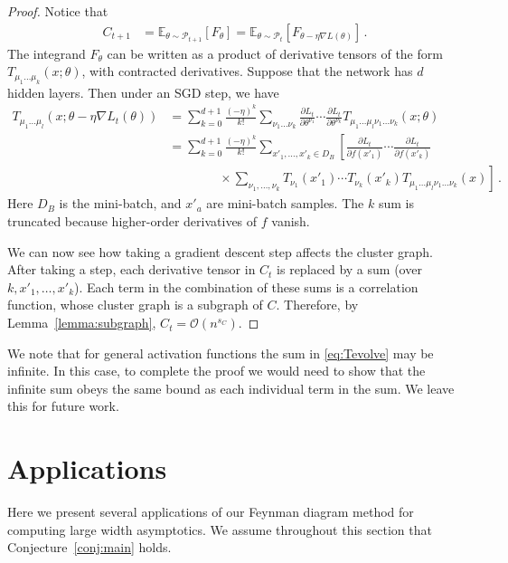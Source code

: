 \documentclass[english]{article}
\newcommand{\dho}{\partial}
\newcommand{\cO}{\ensuremath{\mathcal{O}}}
\newcommand{\cP}{\ensuremath{\mathcal{P}}}
\newcommand{\lexpp}[1]{\mathbb{E}_{#1}\left[}
\newcommand{\rexp}{\right]}
\begin{document}
\begin{proof}
  Notice that
  \begin{align}
    C_{t+1} &= \lexpp{\theta \sim \cP_{t+1}} F_\theta \rexp = \lexpp{\theta \sim \cP_{t}} F_{\theta - \eta \nabla L(\theta)} \rexp \,.
  \end{align}
  The integrand $F_\theta$ can be written as a product of derivative tensors of the form $T_{\mu_1\dots\mu_k}(x;\theta)$, with contracted derivatives.
  Suppose that the network has $d$ hidden layers.
  Then under an SGD step, we have
  \begin{align}
    T_{\mu_1\dots\mu_l}(x;\theta - \eta \nabla L_t(\theta))
    &= \sum_{k=0}^{d+1} \frac{(-\eta)^k}{k!}
      \sum_{\nu_1\dots\nu_k} \frac{\dho L_t}{\dho \theta^{\nu_1}} \cdots \frac{\dho L_t}{\dho \theta^{\nu_k}}
      T_{\mu_1\dots\mu_l\nu_1\dots\nu_k}(x;\theta)
    \\ &= 
         \sum_{k=0}^{d+1} \frac{(-\eta)^k}{k!}
         \sum_{x'_{1},\dots,x'_{k}\in D_{B}}\left[
         \frac{\dho L_t}{\dho f(x'_{1})} \cdots \frac{\dho L_t}{\dho f(x'_{k})}\right.\nonumber\\
         & \left. \ \ \ \ \ \ \ \ \ \ \ \ \ \ \ \ \ \ \times\sum_{\nu_1,\dots,\nu_k} 
         T_{\nu_1}(x'_{1}) \cdots T_{\nu_k}(x'_{k})
         T_{\mu_1\dots\mu_l\nu_1\dots\nu_k}(x)\right]
         \,. \label{eq:Tevolve}
  \end{align}
  Here $D_{B}$ is the mini-batch, and $x'_a$ are mini-batch samples.
  The $k$ sum is truncated because higher-order derivatives of $f$ vanish.

  We can now see how taking a gradient descent step affects the cluster graph.
  After taking a step, each derivative tensor in $C_t$ is replaced by a sum (over $k,x'_1,\dots,x'_k$).
  Each term in the combination of these sums is a correlation function, whose cluster graph is a subgraph of $C$.
  Therefore, by Lemma~\ref{lemma:subgraph}, $C_t = \cO(n^{s_C})$.
\end{proof}
We note that for general activation functions the sum in \eqref{eq:Tevolve} may be infinite.
In this case, to complete the proof we would need to show that the infinite sum obeys the same bound as each individual term in the sum.
We leave this for future work.

\section{Applications}\label{app:app_details}
Here we present several applications of our Feynman diagram method for computing large width asymptotics.
We assume throughout this section that Conjecture~\ref{conj:main} holds.
\end{document}

